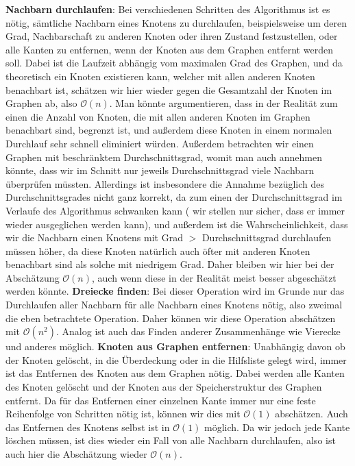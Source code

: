 \documentclass[12pt,onecolumn, notitlepage]{scrartcl}
\begin{document}
\textbf{Nachbarn durchlaufen}: Bei verschiedenen Schritten des Algorithmus ist es nötig, sämtliche Nachbarn eines Knotens zu durchlaufen, beispielsweise um deren Grad, Nachbarschaft zu anderen Knoten oder ihren Zustand festzustellen, oder alle Kanten zu entfernen, wenn der Knoten aus dem Graphen entfernt werden soll. Dabei ist die Laufzeit abhängig vom maximalen Grad des Graphen, und da theoretisch ein Knoten existieren kann, welcher mit allen anderen Knoten benachbart ist, schätzen wir hier wieder gegen die Gesamtzahl der Knoten im Graphen ab, also $\mathcal O(n)$. Man könnte argumentieren, dass in der Realität zum einen die Anzahl von Knoten, die mit allen anderen Knoten im Graphen benachbart sind, begrenzt ist, und außerdem diese Knoten in einem normalen Durchlauf sehr schnell eliminiert  würden. Außerdem betrachten wir einen Graphen mit beschränktem Durchschnittsgrad, womit man auch annehmen könnte, dass wir im Schnitt nur jeweils Durchschnittsgrad viele Nachbarn überprüfen müssten. Allerdings ist insbesondere die Annahme bezüglich des Durchschnittsgrades nicht ganz korrekt, da zum einen der Durchschnittsgrad im Verlaufe des Algorithmus schwanken kann ( wir stellen nur sicher, dass er immer wieder ausgeglichen werden kann), und außerdem ist die Wahrscheinlichkeit, dass wir die Nachbarn einen Knotens mit Grad $>$ Durchschnittsgrad durchlaufen müssen höher, da diese Knoten natürlich auch öfter mit anderen Knoten benachbart sind als solche mit niedrigem Grad. Daher bleiben wir hier bei der Abschätzung $\mathcal O(n)$, auch wenn diese in der Realität meist besser abgeschätzt werden könnte. \newline
\textbf{Dreiecke finden}: Bei dieser Operation wird im Grunde nur das Durchlaufen aller Nachbarn für alle Nachbarn eines Knotens nötig, also zweimal die eben betrachtete Operation. Daher können wir diese Operation abschätzen mit $\mathcal O(n^2)$. Analog ist auch das Finden anderer Zusammenhänge wie Vierecke und anderes möglich.\newline
\textbf{Knoten aus Graphen entfernen}: Unabhängig davon ob der Knoten gelöscht, in die Überdeckung oder in die Hilfsliste gelegt wird, immer ist das Entfernen des Knoten aus dem Graphen nötig. Dabei werden alle Kanten des Knoten gelöscht und der Knoten aus der Speicherstruktur des Graphen entfernt. Da für das Entfernen einer einzelnen Kante immer nur eine feste Reihenfolge von Schritten nötig ist, können wir dies mit $\mathcal O(1)$ abschätzen. Auch das Entfernen des Knotens selbst ist in $\mathcal O(1)$ möglich. Da wir jedoch jede Kante löschen müssen, ist dies wieder ein Fall von alle Nachbarn durchlaufen, also ist auch hier die Abschätzung wieder $\mathcal O(n)$.\newline
\end{document}
